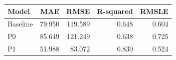 \begin{tabular}{lrrrr}
\toprule
Model & MAE & RMSE & R-squared & RMSLE \\
\midrule
Baseline & 79.950 & 119.589 & 0.648 & 0.604 \\
P0 & 85.649 & 121.249 & 0.638 & 0.725 \\
P1 & 51.988 & 83.072 & 0.830 & 0.524 \\
\bottomrule
\end{tabular}
